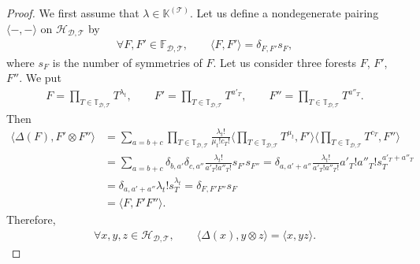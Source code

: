 \documentclass[pdftex]{sigma}
\numberwithin{equation}{section}
\newcommand{\K}{\mathbb{K}}
\newcommand{\T}{\mathcal{T}}
\newcommand{\D}{\mathcal{D}}
\newcommand{\h}{\mathcal{H}}
\newcommand{\bfT}{\mathbb{T}}
\newcommand{\bfF}{\mathbb{F}}
\begin{document}
\begin{proof} We first assume that $\lambda\in \K^{(\T)}$.
Let us define a nondegenerate pairing $\langle-,-\rangle$ on $\h_{\D,\T}$ by
\begin{gather*}
\forall F,F'\in \bfF_{\D,\T},\qquad \langle F, F'\rangle=\delta_{F,F'}s_F,
\end{gather*}
where $s_F$ is the number of symmetries of $F$.
Let us consider three forests $F$, $F'$, $F''$. We put
\begin{gather*}
F=\prod_{T\in \bfT_{\D,\T}} T^{\lambda_t},\qquad
F'=\prod_{T\in \bfT_{\D,\T}} T^{a'_T},\qquad
F''=\prod_{T\in \bfT_{\D,\T}} T^{a''_T}.
\end{gather*}
Then
\begin{align*}
\langle \Delta(F),F'\otimes F''\rangle&=\sum_{a=b+c} \prod_{T\in\bfT_{\D,\T}}\frac{\lambda_t!}{\mu_t!c_T!}
\bigg\langle \prod_{T\in \bfT_{\D,\T}} T^{\mu_t},F'\bigg\rangle \bigg\langle \prod_{T\in \bfT_{\D,\T}} T^{c_T},F''\bigg\rangle
\\
 &=\sum_{a=b+c}\delta_{b,a'}\delta_{c,a''}\frac{\lambda_t!}{a'_T!a''_T!} s_{F'}s_{F''}
=\delta_{a,a'+a''}\frac{\lambda_t!}{a'_T!a''_T!} a'_T!a''_T! s_{T}^{a'_T+a''_T}
 \\
 &=\delta_{a,a'+a''}\lambda_t!s_{T}^{\lambda_t}
=\delta_{F,F'F''}s_F
\\
&=\langle F,F'F''\rangle.
\end{align*}
Therefore,
\begin{gather*}
\forall x,y,z\in \h_{\D,\T},\qquad \langle \Delta(x),y\otimes z\rangle=\langle x,yz\rangle.
\end{gather*}


\end{proof}
\end{document}
